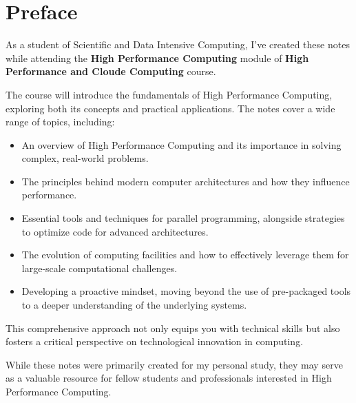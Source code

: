 \chapter*{Preface}

As a student of Scientific and Data Intensive Computing, I've created these notes while attending the \textbf{High Performance Computing} module of \textbf{High Performance and Cloude Computing} course.

The course will introduce the fundamentals of High Performance Computing, exploring both its concepts and practical applications. The notes cover a wide range of topics, including:

\begin{itemize}
    \item An overview of High Performance Computing and its importance in solving complex, real-world problems.
    \item The principles behind modern computer architectures and how they influence performance.
    \item Essential tools and techniques for parallel programming, alongside strategies to optimize code for advanced architectures.
    \item The evolution of computing facilities and how to effectively leverage them for large-scale computational challenges.
    \item Developing a proactive mindset, moving beyond the use of pre-packaged tools to a deeper understanding of the underlying systems.
\end{itemize}
    
This comprehensive approach not only equips you with technical skills but also fosters a critical perspective on technological innovation in computing.

While these notes were primarily created for my personal study, they may serve as a valuable resource for fellow students and professionals interested in High Performance Computing.
